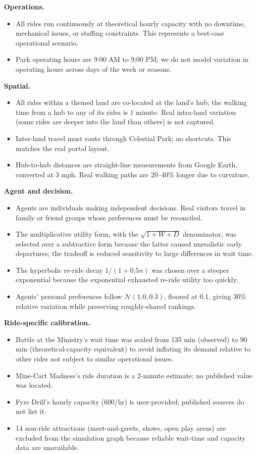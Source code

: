 \documentclass[11pt]{article}
\begin{document}
\textbf{Operations.}
\begin{itemize}[nosep]
    \item All rides run continuously at theoretical hourly capacity with no downtime, mechanical issues, or staffing constraints. This represents a best-case operational scenario.
    \item Park operating hours are 9:00 AM to 9:00 PM; we do not model variation in operating hours across days of the week or seasons.
\end{itemize}

\textbf{Spatial.}
\begin{itemize}[nosep]
    \item All rides within a themed land are co-located at the land's hub; the walking time from a hub to any of its rides is 1 minute. Real intra-land variation (some rides are deeper into the land than others) is not captured.
    \item Inter-land travel must route through Celestial Park; no shortcuts. This matches the real portal layout.
    \item Hub-to-hub distances are straight-line measurements from Google Earth, converted at 3 mph. Real walking paths are 20--40\% longer due to curvature.
\end{itemize}

\textbf{Agent and decision.}
\begin{itemize}[nosep]
    \item Agents are individuals making independent decisions. Real visitors travel in family or friend groups whose preferences must be reconciled.
    \item The multiplicative utility form, with the $\sqrt{1 + W + D}$ denominator, was selected over a subtractive form because the latter caused unrealistic early departures; the tradeoff is reduced sensitivity to large differences in wait time.
    \item The hyperbolic re-ride decay $1/(1 + 0.5n)$ was chosen over a steeper exponential because the exponential exhausted re-ride utility too quickly.
    \item Agents' personal preferences follow $\mathcal{N}(1.0, 0.3)$, floored at 0.1, giving 30\% relative variation while preserving roughly-shared rankings.
\end{itemize}

\textbf{Ride-specific calibration.}
\begin{itemize}[nosep]
    \item Battle at the Ministry's wait time was scaled from 135 min (observed) to 90 min (theoretical-capacity equivalent) to avoid inflating its demand relative to other rides not subject to similar operational issues.
    \item Mine-Cart Madness's ride duration is a 2-minute estimate; no published value was located.
    \item Fyre Drill's hourly capacity (600/hr) is user-provided; published sources do not list it.
    \item 14 non-ride attractions (meet-and-greets, shows, open play areas) are excluded from the simulation graph because reliable wait-time and capacity data are unavailable.
\end{itemize}
\end{document}
